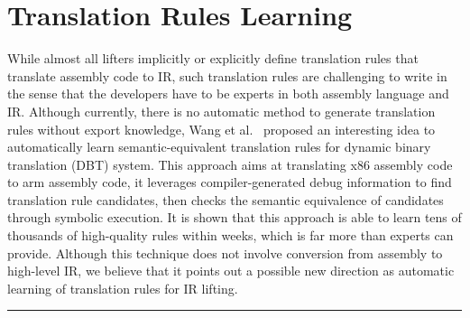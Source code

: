 \section{Translation Rules Learning} \label{sec:advanced-rules}
While almost all lifters implicitly or explicitly define translation rules that translate assembly code to IR, such translation rules are challenging to write in the sense that the developers have to be experts in both assembly language and IR. Although currently, there is no automatic method to generate translation rules without export knowledge, Wang et al.~\cite{wang2018enhancing,song2019unleashing} proposed an interesting idea to automatically learn semantic-equivalent translation rules for dynamic binary translation (DBT) system.
%
This approach aims at translating x86 assembly code to arm assembly code, it leverages compiler-generated debug information to find translation rule candidates, then checks the semantic equivalence of candidates through symbolic execution. It is shown that this approach is able to learn tens of thousands of high-quality rules within weeks, which is far more than experts can provide. Although this technique does not involve conversion from assembly to high-level IR, we believe that it points out a possible new direction as automatic learning of translation rules for IR lifting.

\noindent\rule{8cm}{0.4pt}

\newpage
